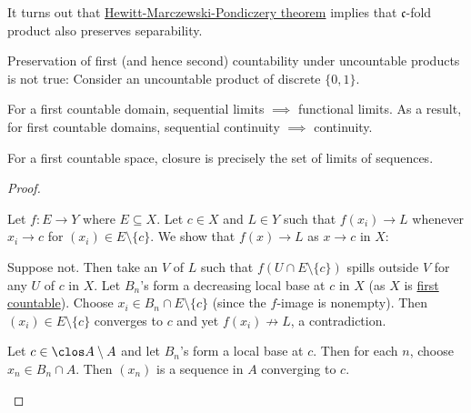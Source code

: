 	\begin{rmk}
		It turns out that \href{https://math.stackexchange.com/a/526460/673223}{Hewitt-Marczewski-Pondiczery theorem} implies that $\mathfrak c$-fold product also preserves separability.
		
		Preservation of first (and hence second) countability under uncountable products is not true: Consider an uncountable product of discrete $\{0, 1\}$.
	\end{rmk}
	
	
	\begin{prp}\label{PRP: continuity and closure in first countable}
		\leavevmode
		\begin{mylist}
			\item\label{PRPi: continuity and closure in first countable} For a first countable domain, sequential limits $\implies$ functional limits. As a result, for first countable domains, sequential continuity $\implies$ continuity.
			
			\item For a first countable space, closure is precisely the set of limits of sequences.
		\end{mylist}
	\end{prp}
	
	\begin{proof}
		\begin{mylist}
			\item Let $f\colon E\to Y$ where $E\subseteq X$. Let $c\in X$ and $L\in Y$ such that $f(x_i)\to L$ whenever $x_i\to c$ for $(x_i)\in E\setminus\{c\}$. We show that $f(x)\to L$ as $x\to c$ in $X$:
			\begin{subproof}
				Suppose not. Then take an \onbd $V$ of $L$ such that $f(U\cap E\setminus\{c\})$ spills outside $V$ for any \onbd $U$ of $c$ in $X$. Let $B_n$'s form a decreasing local base at $c$ in $X$ (as $X$ is \uline{first countable}). Choose $x_i\in B_n\cap E\setminus\{c\}$ (since the $f$-image is nonempty). Then $(x_i)\in E\setminus\{c\}$ converges to $c$ and yet $f(x_i)\not\to L$, a contradiction.
			\end{subproof}
			
			\item Let $c\in\clos A\setminus A$ and let $B_n$'s form a local base at $c$. Then for each $n$, choose $x_n\in B_n\cap A$. Then $(x_n)$ is a sequence in $A$ converging to $c$.\qedhere
		\end{mylist}
	\end{proof}
	
